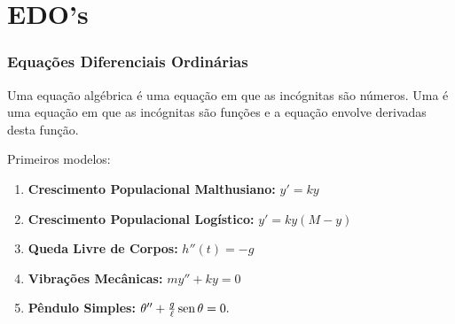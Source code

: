 \section{EDO's}




\begin{frame}
\frametitle{Equações Diferenciais Ordinárias }

Uma equação algébrica é uma equação em que as incógnitas são números. Uma  é uma equação em que as incógnitas são funções e a equação envolve derivadas desta função. 

\begin{exe}
Primeiros modelos:
\begin{enumerate}
\item \textbf{Crescimento Populacional Malthusiano:} $y'=ky$ 
\item \textbf{Crescimento Populacional Logístico:} $y'=ky(M-y)$
\item \textbf{Queda Livre de Corpos:} $h''(t)=-g$
\item \textbf{Vibrações Mecânicas:} $my''+ky=0$
\item \textbf{Pêndulo Simples:} $\theta''+\frac{g}{\ell}\operatorname{sen}\theta=0.$
\end{enumerate}
\end{exe}



\end{frame}




